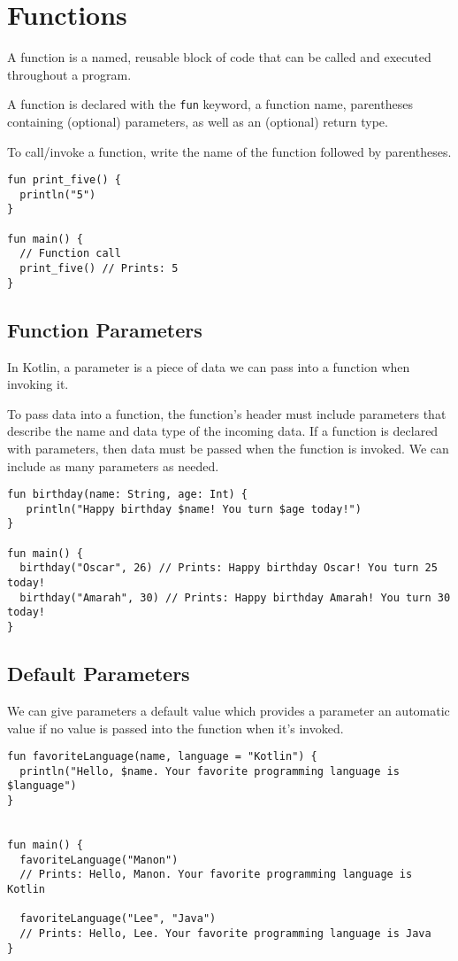 \chapter{Functions}
A function is a named, reusable block of code that can be called and executed throughout a program.

A function is declared with the \verb!fun! keyword, a function name, parentheses containing (optional) 
parameters, as well as an (optional) return type.

To call/invoke a function, write the name of the function followed by parentheses.

\begin{verbatim}
fun print_five() {
  println("5")
}
 
fun main() {
  // Function call
  print_five() // Prints: 5
}    
\end{verbatim}

\section{Function Parameters}
In Kotlin, a parameter is a piece of data we can pass into a function when invoking it.

To pass data into a function, the function’s header must include parameters that describe the name and data type of the incoming data. 
If a function is declared with parameters, then data must be passed when the function is invoked. We can include as many parameters as needed.

\begin{verbatim}
fun birthday(name: String, age: Int) {
   println("Happy birthday $name! You turn $age today!")
}
 
fun main() {
  birthday("Oscar", 26) // Prints: Happy birthday Oscar! You turn 25 today!
  birthday("Amarah", 30) // Prints: Happy birthday Amarah! You turn 30 today!
}
\end{verbatim}

\section{Default Parameters}
We can give parameters a default value which provides a parameter an automatic value if no value is passed into the function when it’s invoked.
\begin{verbatim}
fun favoriteLanguage(name, language = "Kotlin") {
  println("Hello, $name. Your favorite programming language is $language")  
}
 
 
fun main() {
  favoriteLanguage("Manon") 
  // Prints: Hello, Manon. Your favorite programming language is Kotlin
  
  favoriteLanguage("Lee", "Java") 
  // Prints: Hello, Lee. Your favorite programming language is Java
}
\end{verbatim}

